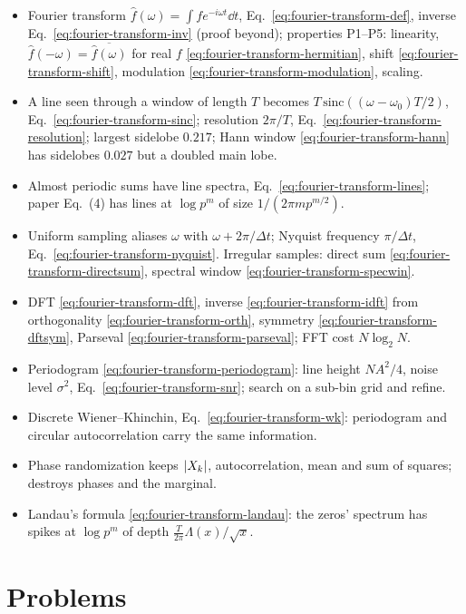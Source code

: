 \begin{itemize}
\item Fourier transform $\hat f(\omega)=\int f e^{-i\omega t}\dd t$, Eq.~\eqref{eq:fourier-transform-def}, inverse Eq.~\eqref{eq:fourier-transform-inv} (proof beyond); properties P1--P5: linearity, $\hat f(-\omega)=\overline{\hat f(\omega)}$ for real $f$ \eqref{eq:fourier-transform-hermitian}, shift \eqref{eq:fourier-transform-shift}, modulation \eqref{eq:fourier-transform-modulation}, scaling.
\item A line seen through a window of length $T$ becomes $T\,\mathrm{sinc}((\omega-\omega_0)T/2)$, Eq.~\eqref{eq:fourier-transform-sinc}; resolution $2\pi/T$, Eq.~\eqref{eq:fourier-transform-resolution}; largest sidelobe $0.217$; Hann window \eqref{eq:fourier-transform-hann} has sidelobes $0.027$ but a doubled main lobe.
\item Almost periodic sums have line spectra, Eq.~\eqref{eq:fourier-transform-lines}; paper Eq.~(4) has lines at $\log p^m$ of size $1/(2\pi m p^{m/2})$.
\item Uniform sampling aliases $\omega$ with $\omega+2\pi/\Delta t$; Nyquist frequency $\pi/\Delta t$, Eq.~\eqref{eq:fourier-transform-nyquist}. Irregular samples: direct sum \eqref{eq:fourier-transform-directsum}, spectral window \eqref{eq:fourier-transform-specwin}.
\item DFT \eqref{eq:fourier-transform-dft}, inverse \eqref{eq:fourier-transform-idft} from orthogonality \eqref{eq:fourier-transform-orth}, symmetry \eqref{eq:fourier-transform-dftsym}, Parseval \eqref{eq:fourier-transform-parseval}; FFT cost $N\log_2N$.
\item Periodogram \eqref{eq:fourier-transform-periodogram}: line height $NA^2/4$, noise level $\sigma^2$, Eq.~\eqref{eq:fourier-transform-snr}; search on a sub-bin grid and refine.
\item Discrete Wiener--Khinchin, Eq.~\eqref{eq:fourier-transform-wk}: periodogram and circular autocorrelation carry the same information.
\item Phase randomization keeps $\left\lvert X_k\right\rvert$, autocorrelation, mean and sum of squares; destroys phases and the marginal.
\item Landau's formula \eqref{eq:fourier-transform-landau}: the zeros' spectrum has spikes at $\log p^m$ of depth $\frac{T}{2\pi}\Lambda(x)/\sqrt x$.
\end{itemize}

\section{Problems}

